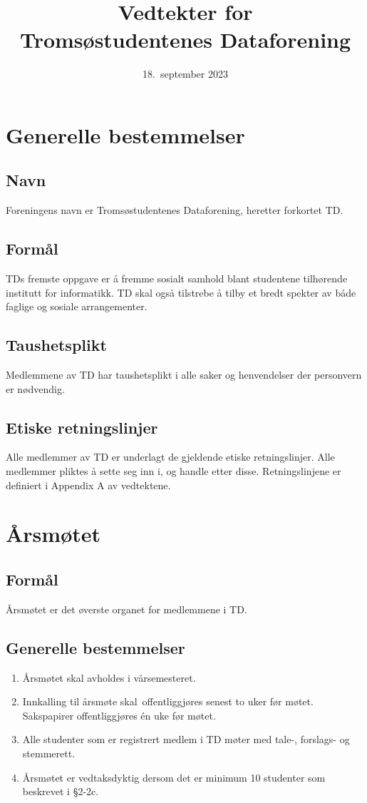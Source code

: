 \documentclass[11pt]{article}
\title{\Huge{Vedtekter for\\Tromsøstudentenes Dataforening}}
\date{18.\ september 2023}
\author{}
\begin{document}
\maketitle
\section{Generelle bestemmelser}
\subsection{Navn}
Foreningens navn er Tromsøstudentenes Dataforening, heretter forkortet TD.

\subsection{Formål}
TDs fremste oppgave er å fremme sosialt samhold blant studentene tilhørende institutt for informatikk.
TD skal også tilstrebe å tilby et bredt spekter av både faglige og sosiale arrangementer. 

\subsection{Taushetsplikt}
Medlemmene av TD har taushetsplikt i alle saker og henvendelser der personvern er nødvendig. 

\subsection{Etiske retningslinjer}
Alle medlemmer av TD er underlagt de gjeldende etiske retningslinjer. Alle medlemmer pliktes å sette seg inn i, og handle etter disse. Retningslinjene er definiert i Appendix A av vedtektene.

\section{Årsmøtet}
\subsection{Formål}
Årsmøtet er det øverste organet for medlemmene i TD.

\subsection{Generelle bestemmelser}
\begin{enumerate}
	\item Årsmøtet skal avholdes i vårsemesteret.
	\item Innkalling til årsmøte skal offentliggjøres senest to uker før møtet. Sakspapirer offentliggjøres én uke før møtet. 
	\item Alle studenter som er registrert medlem i TD møter med tale-, forslags- og stemmerett. 
	\item Årsmøtet er vedtaksdyktig dersom det er minimum 10 studenter som beskrevet i §2-2c.
\end{enumerate}
\end{document}
